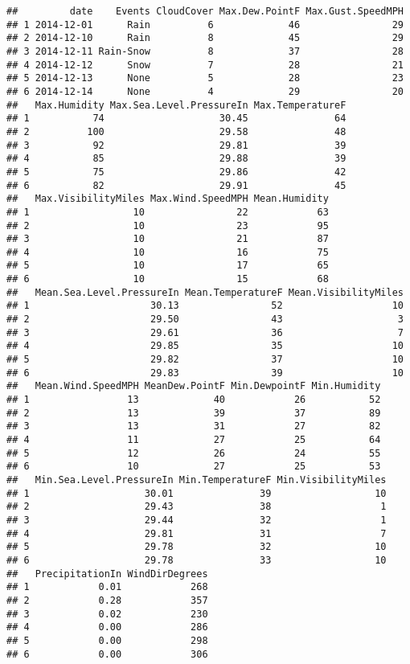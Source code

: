 \documentclass[]{article}
\begin{document}
\begin{verbatim}
##         date    Events CloudCover Max.Dew.PointF Max.Gust.SpeedMPH
## 1 2014-12-01      Rain          6             46                29
## 2 2014-12-10      Rain          8             45                29
## 3 2014-12-11 Rain-Snow          8             37                28
## 4 2014-12-12      Snow          7             28                21
## 5 2014-12-13      None          5             28                23
## 6 2014-12-14      None          4             29                20
##   Max.Humidity Max.Sea.Level.PressureIn Max.TemperatureF
## 1           74                    30.45               64
## 2          100                    29.58               48
## 3           92                    29.81               39
## 4           85                    29.88               39
## 5           75                    29.86               42
## 6           82                    29.91               45
##   Max.VisibilityMiles Max.Wind.SpeedMPH Mean.Humidity
## 1                  10                22            63
## 2                  10                23            95
## 3                  10                21            87
## 4                  10                16            75
## 5                  10                17            65
## 6                  10                15            68
##   Mean.Sea.Level.PressureIn Mean.TemperatureF Mean.VisibilityMiles
## 1                     30.13                52                   10
## 2                     29.50                43                    3
## 3                     29.61                36                    7
## 4                     29.85                35                   10
## 5                     29.82                37                   10
## 6                     29.83                39                   10
##   Mean.Wind.SpeedMPH MeanDew.PointF Min.DewpointF Min.Humidity
## 1                 13             40            26           52
## 2                 13             39            37           89
## 3                 13             31            27           82
## 4                 11             27            25           64
## 5                 12             26            24           55
## 6                 10             27            25           53
##   Min.Sea.Level.PressureIn Min.TemperatureF Min.VisibilityMiles
## 1                    30.01               39                  10
## 2                    29.43               38                   1
## 3                    29.44               32                   1
## 4                    29.81               31                   7
## 5                    29.78               32                  10
## 6                    29.78               33                  10
##   PrecipitationIn WindDirDegrees
## 1            0.01            268
## 2            0.28            357
## 3            0.02            230
## 4            0.00            286
## 5            0.00            298
## 6            0.00            306
\end{verbatim}
\end{document}
